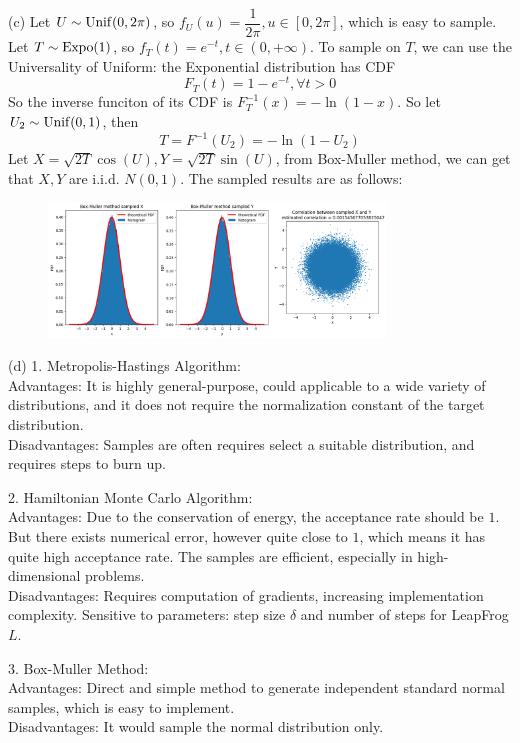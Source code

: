 \begin{homeworkProblem}
(c) Let $U\sim \operatorname{Unif}(0,2\pi)$, so $f_U(u)=\dfrac{1}{2\pi},u\in [0,2\pi]$, which is easy to sample. Let $T\sim \operatorname{Expo}(1)$, so $f_T(t)=e^{-t}, t\in (0,+\infty)$. To sample on $T$, we can use the Universality of Uniform: the Exponential distribution has CDF
$$F_T(t) = 1 - e^{-t}, \forall t > 0$$
So the inverse funciton of its CDF is $ F^{-1}_T(x) = -\ln(1-x)$. So let $U_2\sim \operatorname{Unif}(0,1)$, then
$$T = F^{-1}(U_2)=-\ln(1-U_2)$$
Let $X=\sqrt{2T}\cos(U), Y=\sqrt{2T}\sin(U)$, from Box-Muller method, we can get that $X,Y$ are i.i.d. $N(0,1)$. The sampled results are as follows:
\begin{figure}[h]
    \centering
    \includegraphics[width=0.8\textwidth]{./figure/p4/box_muller.png}
\end{figure}

(d) 1. Metropolis-Hastings Algorithm: \\
Advantages: It is highly general-purpose, could applicable to a wide variety of distributions, and it does not require the normalization constant of the target distribution. \\
Disadvantages: Samples are often requires select a suitable distribution, and requires steps to burn up.

2. Hamiltonian Monte Carlo Algorithm: \\
Advantages: Due to the conservation of energy, the acceptance rate should be $1$. But there exists numerical error, however quite close to $1$, which means it has quite high acceptance rate. The samples are efficient, especially in high-dimensional problems. \\
Disadvantages: Requires computation of gradients, increasing implementation complexity. Sensitive to parameters: step size $\delta$ and number of steps for LeapFrog $L$.

3. Box-Muller Method: \\
Advantages: Direct and simple method to generate independent standard normal samples, which is easy to implement. \\
Disadvantages: It would sample the normal distribution only.

\end{homeworkProblem}

\newpage